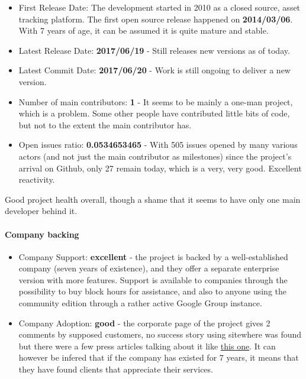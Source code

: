 \documentclass{article}
\begin{document}
\begin{itemize}
\item First Release Date: The development started in 2010 as a closed source, asset tracking platform. The first open source release happened on \textbf{2014/03/06}. With 7 years of age, it can be assumed it is quite mature and stable.
\item Latest Release Date: \textbf{2017/06/19} - Still releases new versions as of today.
\item Latest Commit Date: \textbf{2017/06/20} - Work is still ongoing to deliver a new version.
\item Number of main contributors: \textbf{1} - It seems to be mainly a one-man project, which is a problem. Some other people have contributed little bits of code, but not to the extent the main contributor has.
\item Open issues ratio: \textbf{0.0534653465} - With 505 issues opened by many various actors (and not just the main contributor as milestones) since the project's arrival on Github, only 27 remain today, which is a very, very good. Excellent reactivity.
\end{itemize}

Good project health overall, though a shame that it seems to have only one main developer behind it.

\paragraph{Company backing}

\begin{itemize}
\item Company Support: \textbf{excellent} - the project is backed by a well-established company (seven years of existence), and they offer a separate enterprise version with more features. Support is available to companies through the possibility to buy block hours for assistance, and also to anyone using the community edition through a rather active Google Group instance.
\item Company Adoption: \textbf{good} - the corporate page of the project gives 2 comments by supposed customers, no success story using sitewhere was found but there were a few press articles talking about it like \href{https://opensourceforu.com/2017/07/sitewhere-open-platform-connected-devices/?utm_content=buffer4c828&utm_medium=social&utm_source=twitter.com&utm_campaign=buffer}{this one}. It can however be infered that if the company has existed for 7 years, it means that they have found clients that appreciate their services.
\end{itemize}
\end{document}
